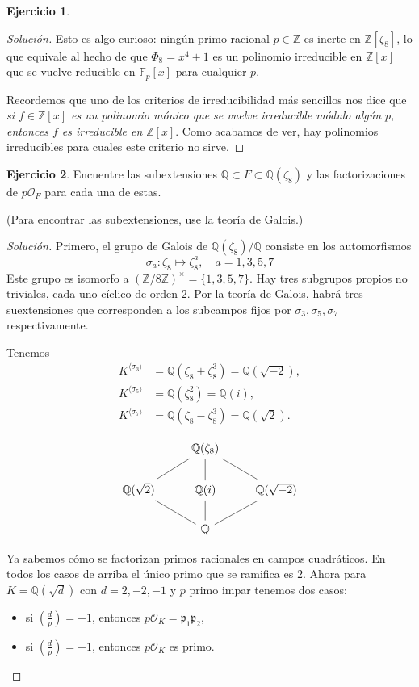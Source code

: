 \documentclass{article}
\newcounter{tarea}
\theoremstyle{definition}
\newtheorem{ejercicio}{Ejercicio}[tarea]
\newenvironment{solucion}{\begin{proof}[Solución]}{\end{proof}}
\newcommand{\legendre}[2]{\left(\frac{#1}{#2}\right)}
\newcommand{\ZZ}{\mathbb{Z}}
\newcommand{\FF}{\mathbb{F}}
\newcommand{\QQ}{\mathbb{Q}}
\renewcommand{\O}{\mathcal{O}}
\begin{document}
\begin{ejercicio}
\begin{solucion}
    Esto es algo curioso: ningún primo racional $p \in \ZZ$ es inerte en
    $\ZZ [\zeta_8]$, lo que equivale al hecho de que $\Phi_8 = x^4 + 1$
    es un polinomio irreducible en $\ZZ [x]$ que se vuelve reducible en
    $\FF_p [x]$ para cualquier $p$.

    Recordemos que uno de los criterios de irreducibilidad más sencillos nos
    dice que \emph{si $f \in \ZZ [x]$ es un polinomio mónico que se vuelve
      irreducible módulo algún $p$, entonces $f$ es irreducible en
      $\ZZ [x]$}. Como acabamos de ver, hay polinomios irreducibles para cuales
    este criterio no sirve.
  \end{solucion}
  \fi
\end{ejercicio}

\begin{ejercicio}
  Encuentre las subextensiones
  $\QQ \subset F \subset \QQ (\zeta_8)$ y las factorizaciones de
  $p \O_F$ para cada una de estas.

  \noindent (Para encontrar las subextensiones, use la teoría de Galois.)

  \ifdefined\solutions
  \begin{solucion}
    Primero, el grupo de Galois de $\QQ (\zeta_8)/\QQ$ consiste en
    los automorfismos
    $$\sigma_a\colon \zeta_8 \mapsto \zeta_8^a, \quad a = 1, 3, 5, 7$$
    Este grupo es isomorfo a $(\ZZ/8\ZZ)^\times = \{ 1, 3, 5, 7 \}$. Hay tres
    subgrupos propios no triviales, cada uno cíclico de orden $2$. Por la teoría
    de Galois, habrá tres suextensiones que corresponden a los subcampos fijos
    por $\sigma_3, \sigma_5, \sigma_7$ respectivamente.

    Tenemos
    \begin{align*}
      K^{\langle \sigma_3\rangle} & = \QQ (\zeta_8 + \zeta_8^3) = \QQ (\sqrt{-2}),\\
      K^{\langle \sigma_5\rangle} & = \QQ (\zeta_8^2) = \QQ (i),\\
      K^{\langle \sigma_7\rangle} & = \QQ (\zeta_8 - \zeta_8^3) = \QQ (\sqrt{2}).
    \end{align*}

    \[ \begin{tikzcd}
      & \QQ (\zeta_8) \ar[-]{dl}\ar[-]{d}\ar[-]{dr} \\
      \QQ (\sqrt{2})\ar[-]{dr} & \QQ (i)\ar[-]{d} & \QQ (\sqrt{-2})\ar[-]{dl} \\
      & \QQ
    \end{tikzcd} \]

    Ya sabemos cómo se factorizan primos racionales en campos cuadráticos.
    En todos los casos de arriba el único primo que se ramifica es
    $2$. Ahora para $K = \QQ (\sqrt{d})$ con $d = 2, -2, -1$ y $p$ primo impar
    tenemos dos casos:
    \begin{itemize}
    \item si $\legendre{d}{p} = +1$, entonces
      $p\O_K = \mathfrak{p}_1 \mathfrak{p}_2$,
      \item si $\legendre{d}{p} = -1$, entonces $p\O_K$ es primo.
    \end{itemize}


\end{solucion}
\end{ejercicio}
\end{document}
